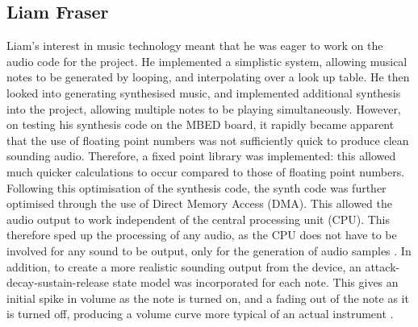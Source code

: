 \subsection*{Liam Fraser}
Liam's interest in music technology meant that he was eager to work on the 
audio code for the project. He implemented a simplistic system, allowing musical 
notes to be generated by looping, and interpolating over a look up table. He then 
looked into generating synthesised music, and implemented additional synthesis 
into the project, allowing multiple notes to be playing simultaneously. However, 
on testing his synthesis code on the MBED board, it rapidly became apparent that 
the use of floating point numbers was not sufficiently quick to produce clean 
sounding audio. Therefore, a fixed point library was implemented: this allowed 
much quicker calculations to occur compared to those of floating point numbers. 
Following this optimisation of the synthesis code, the synth code was further 
optimised through the use of Direct Memory Access (DMA). This allowed the audio 
output to work independent of the central processing unit (CPU). This 
therefore sped up the processing of any audio, as the CPU does not have to be 
involved for any sound to be output, only for the generation of audio samples 
\cite{dma-book}. In addition, to create a more realistic sounding output from the 
device, an attack-decay-sustain-release state model was incorporated for each note. 
This gives an initial spike in volume as the note is turned on, and a fading out 
of the note as it is turned off, producing a volume curve more typical of an 
actual instrument \cite{asr-book}.


